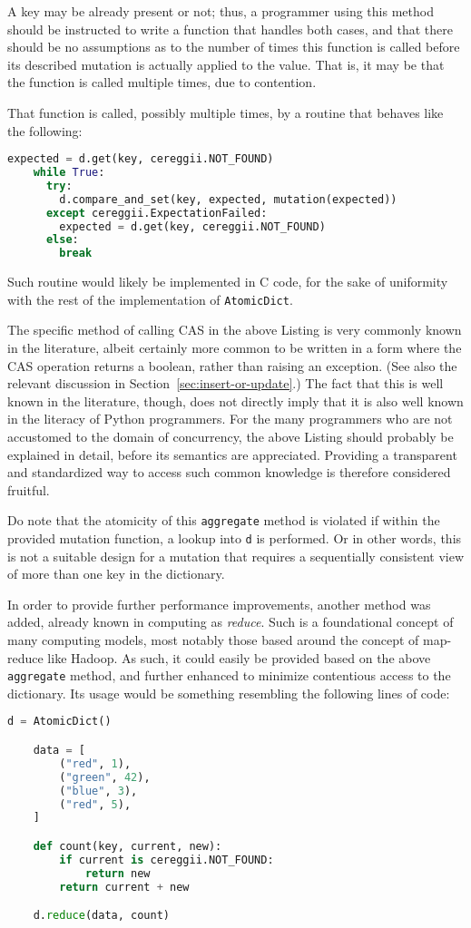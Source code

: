A key may be already present or not; thus, a programmer using this method should be instructed to write a function that handles both cases, and that there should be no assumptions as to the number of times this function is called before its described mutation is actually applied to the value.
That is, it may be that the function is called multiple times, due to contention.

That function is called, possibly multiple times, by a routine that behaves like the following:
\begin{lstlisting}[capition={A common pattern when using CAS instructions.}, label={lst:aggregate}, language=Python]
	expected = d.get(key, cereggii.NOT_FOUND)
	while True:
	  try:
	    d.compare_and_set(key, expected, mutation(expected))
	  except cereggii.ExpectationFailed:
	    expected = d.get(key, cereggii.NOT_FOUND)
	  else:
	    break
\end{lstlisting}
Such routine would likely be implemented in C code, for the sake of uniformity with the rest of the implementation of \texttt{AtomicDict}.

The specific method of calling CAS in the above Listing is very commonly known in the literature, albeit certainly more common to be written in a form where the CAS operation returns a boolean, rather than raising an exception.
(See also the relevant discussion in Section~\ref{sec:insert-or-update}.)
The fact that this is well known in the literature, though, does not directly imply that it is also well known in the literacy of Python programmers.
For the many programmers who are not accustomed to the domain of concurrency, the above Listing should probably be explained in detail, before its semantics are appreciated.
Providing a transparent and standardized way to access such common knowledge is therefore considered fruitful.

Do note that the atomicity of this \texttt{aggregate} method is violated if within the provided mutation function, a lookup into \texttt{d} is performed.
Or in other words, this is not a suitable design for a mutation that requires a sequentially consistent view of more than one key in the dictionary.

In order to provide further performance improvements, another method was added, already known in computing as \emph{reduce}.
Such is a foundational concept of many computing models, most notably those based around the concept of map-reduce like Hadoop.
As such, it could easily be provided based on the above \texttt{aggregate} method, and further enhanced to minimize contentious access to the dictionary.
Its usage would be something resembling the following lines of code:
\begin{lstlisting}[label={lst:reduce-usage}, language=Python]
	d = AtomicDict()

    data = [
        ("red", 1),
        ("green", 42),
        ("blue", 3),
        ("red", 5),
    ]

    def count(key, current, new):
        if current is cereggii.NOT_FOUND:
            return new
        return current + new

    d.reduce(data, count)
\end{lstlisting}

